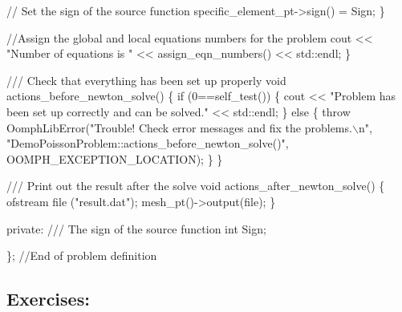 \begin{DoxyCodeInclude}
      \textcolor{comment}{// Set the sign of the source function}
      specific\_element\_pt->sign() = Sign;
     \}

    \textcolor{comment}{//Assign the global and local equations numbers for the problem}
    cout << \textcolor{stringliteral}{"Number of equations is "} << assign\_eqn\_numbers() << std::endl;
   \}

  \textcolor{comment}{}
\textcolor{comment}{  /// Check that everything has been set up properly}
\textcolor{comment}{}  \textcolor{keywordtype}{void} actions\_before\_newton\_solve()
   \{
    \textcolor{keywordflow}{if} (0==self\_test())
     \{
      cout << \textcolor{stringliteral}{"Problem has been set up correctly and can be solved."} 
           << std::endl;
     \}
    \textcolor{keywordflow}{else}
     \{
      \textcolor{keywordflow}{throw} 
       OomphLibError(\textcolor{stringliteral}{"Trouble! Check error messages and fix the problems.\(\backslash\)n"},
                     \textcolor{stringliteral}{"DemoPoissonProblem::actions\_before\_newton\_solve()"},
                     OOMPH\_EXCEPTION\_LOCATION);
     \}
   \}

  \textcolor{comment}{}
\textcolor{comment}{  /// Print out the result after the solve}
\textcolor{comment}{}  \textcolor{keywordtype}{void} actions\_after\_newton\_solve() 
   \{
    ofstream file (\textcolor{stringliteral}{"result.dat"});
    mesh\_pt()->output(file);
   \}

 \textcolor{keyword}{private}:
\textcolor{comment}{}
\textcolor{comment}{  /// The sign of the source function}
\textcolor{comment}{}  \textcolor{keywordtype}{int} Sign;


\}; \textcolor{comment}{//End of problem definition}

\end{DoxyCodeInclude}




 \hypertarget{index_problem_exercise}{}\subsection{Exercises\+:}\label{index_problem_exercise}

